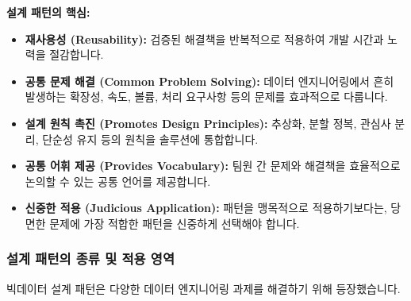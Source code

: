 \documentclass[11pt,a4paper]{article}
\begin{document}
\begin{summarybox}
\textbf{설계 패턴의 핵심:}
\begin{itemize}
    \item \textbf{재사용성 (Reusability):} 검증된 해결책을 반복적으로 적용하여 개발 시간과 노력을 절감합니다.
    \item \textbf{공통 문제 해결 (Common Problem Solving):} 데이터 엔지니어링에서 흔히 발생하는 확장성, 속도, 볼륨, 처리 요구사항 등의 문제를 효과적으로 다룹니다.
    \item \textbf{설계 원칙 촉진 (Promotes Design Principles):} 추상화, 분할 정복, 관심사 분리, 단순성 유지 등의 원칙을 솔루션에 통합합니다.
    \item \textbf{공통 어휘 제공 (Provides Vocabulary):} 팀원 간 문제와 해결책을 효율적으로 논의할 수 있는 공통 언어를 제공합니다.
    \item \textbf{신중한 적용 (Judicious Application):} 패턴을 맹목적으로 적용하기보다는, 당면한 문제에 가장 적합한 패턴을 신중하게 선택해야 합니다.
\end{itemize}
\end{summarybox}

\subsubsection{설계 패턴의 종류 및 적용 영역}
빅데이터 설계 패턴은 다양한 데이터 엔지니어링 과제를 해결하기 위해 등장했습니다.
\end{document}

